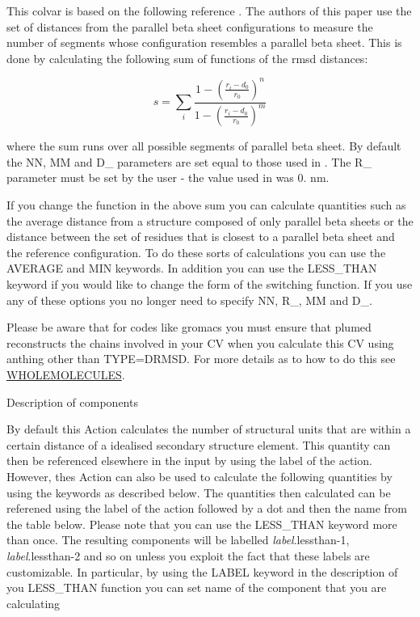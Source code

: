This colvar is based on the following reference \cite{pietrucci09jctc}. The authors of this paper use the set of distances from the parallel beta sheet configurations to measure the number of segments whose configuration resembles a parallel beta sheet. This is done by calculating the following sum of functions of the rmsd distances\+:

\[ s = \sum_i \frac{ 1 - \left(\frac{r_i-d_0}{r_0}\right)^n } { 1 - \left(\frac{r_i-d_0}{r_0}\right)^m } \]

where the sum runs over all possible segments of parallel beta sheet. By default the N\+N, M\+M and D\+\_ parameters are set equal to those used in \cite{pietrucci09jctc}. The R\+\_ parameter must be set by the user -\/ the value used in \cite{pietrucci09jctc} was 0. nm.

If you change the function in the above sum you can calculate quantities such as the average distance from a structure composed of only parallel beta sheets or the distance between the set of residues that is closest to a parallel beta sheet and the reference configuration. To do these sorts of calculations you can use the A\+V\+E\+R\+A\+G\+E and M\+I\+N keywords. In addition you can use the L\+E\+S\+S\+\_\+\+T\+H\+A\+N keyword if you would like to change the form of the switching function. If you use any of these options you no longer need to specify N\+N, R\+\_, M\+M and D\+\_.

Please be aware that for codes like gromacs you must ensure that plumed reconstructs the chains involved in your C\+V when you calculate this C\+V using anthing other than T\+Y\+P\+E=D\+R\+M\+S\+D. For more details as to how to do this see \hyperlink{WHOLEMOLECULES}{W\+H\+O\+L\+E\+M\+O\+L\+E\+C\+U\+L\+E\+S}.

\begin{DoxyParagraph}{Description of components}

\end{DoxyParagraph}
By default this Action calculates the number of structural units that are within a certain distance of a idealised secondary structure element. This quantity can then be referenced elsewhere in the input by using the label of the action. However, thes Action can also be used to calculate the following quantities by using the keywords as described below. The quantities then calculated can be referened using the label of the action followed by a dot and then the name from the table below. Please note that you can use the L\+E\+S\+S\+\_\+\+T\+H\+A\+N keyword more than once. The resulting components will be labelled {\itshape label}.lessthan-\/1, {\itshape label}.lessthan-\/2 and so on unless you exploit the fact that these labels are customizable. In particular, by using the L\+A\+B\+E\+L keyword in the description of you L\+E\+S\+S\+\_\+\+T\+H\+A\+N function you can set name of the component that you are calculating

